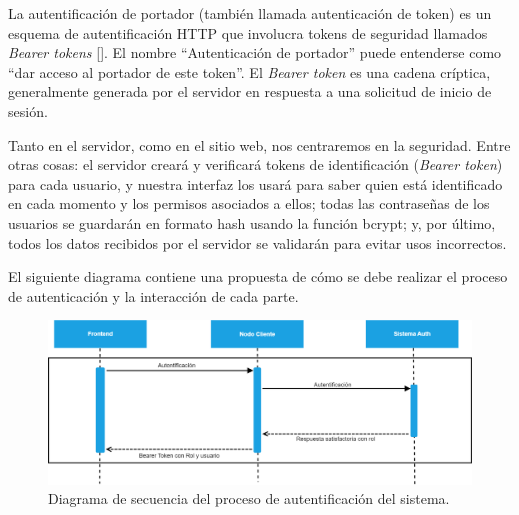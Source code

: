 
La autentificación de portador (también llamada autenticación de token) es un esquema de autentificación HTTP que involucra tokens de seguridad llamados \textit{Bearer tokens} [\cite{98}]. El nombre ``Autenticación de portador'' puede entenderse como ``dar acceso al portador de este token''. El \textit{Bearer token} es una cadena críptica, generalmente generada por el servidor en respuesta a una solicitud de inicio de sesión.

Tanto en el servidor, como en el sitio web, nos centraremos en la seguridad. Entre otras cosas: el servidor creará y verificará tokens de identificación (\textit{Bearer token}) para cada usuario, y nuestra interfaz los usará para saber quien está identificado en cada momento y los permisos asociados a ellos; todas las contraseñas de los usuarios se guardarán en formato hash usando la función bcrypt; y, por último, todos los datos recibidos por el servidor se validarán para evitar usos incorrectos.


El siguiente diagrama contiene una propuesta de cómo se debe realizar el proceso de autenticación y la interacción de cada parte.

\begin{figure}[!h]
\centering
\includegraphics[scale=0.3]{Graphics/autht}
\caption{Diagrama de secuencia del proceso de autentificación del sistema.}
\label{fig:autht}
\end{figure}

